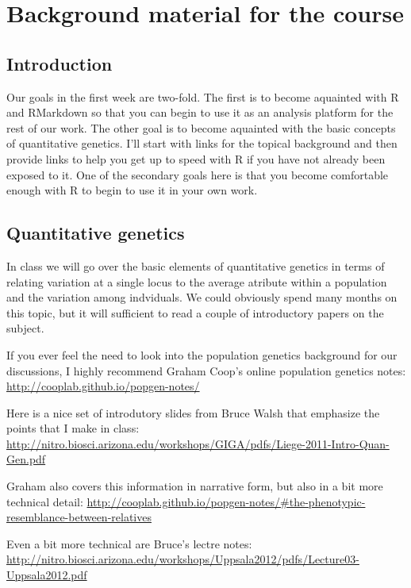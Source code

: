 \documentclass[]{book}
\begin{document}
\hypertarget{background-material-for-the-course}{%
\chapter{Background material for the course}\label{background-material-for-the-course}}

\hypertarget{introduction}{%
\section{Introduction}\label{introduction}}

Our goals in the first week are two-fold. The first is to become aquainted with R and RMarkdown so that you can begin to use it as an analysis platform for the rest of our work. The other goal is to become aquainted with the basic concepts of quantitative genetics. I'll start with links for the topical background and then provide links to help you get up to speed with R if you have not already been exposed to it. One of the secondary goals here is that you become comfortable enough with R to begin to use it in your own work.

\hypertarget{quantitative-genetics}{%
\section{Quantitative genetics}\label{quantitative-genetics}}

In class we will go over the basic elements of quantitative genetics in terms of relating variation at a single locus to the average atribute within a population and the variation among indviduals. We could obviously spend many months on this topic, but it will sufficient to read a couple of introductory papers on the subject.

If you ever feel the need to look into the population genetics background for our discussions, I highly recommend Graham Coop's online population genetics notes:
\url{http://cooplab.github.io/popgen-notes/}

Here is a nice set of introdutory slides from Bruce Walsh that emphasize the points that I make in class:
\url{http://nitro.biosci.arizona.edu/workshops/GIGA/pdfs/Liege-2011-Intro-Quan-Gen.pdf}

Graham also covers this information in narrative form, but also in a bit more technical detail:
\url{http://cooplab.github.io/popgen-notes/\#the-phenotypic-resemblance-between-relatives}

Even a bit more technical are Bruce's lectre notes:
\url{http://nitro.biosci.arizona.edu/workshops/Uppsala2012/pdfs/Lecture03-Uppsala2012.pdf}
\end{document}
